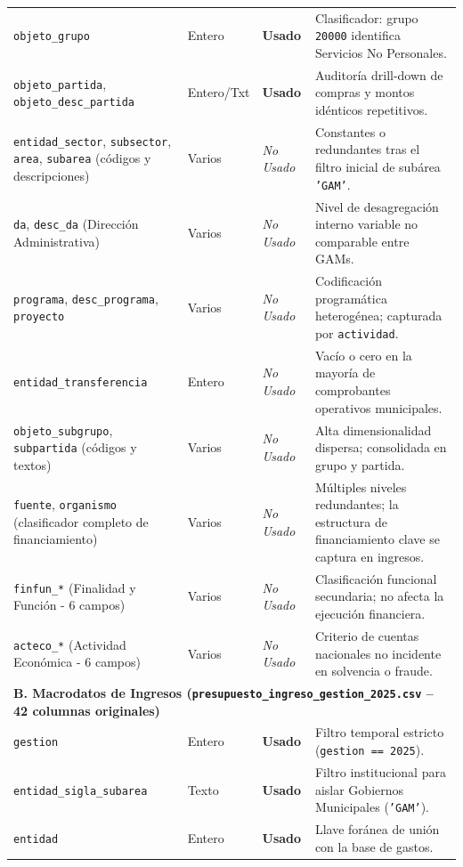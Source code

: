 \begin{table}[H]
\begin{tabularx}{\textwidth}{p{3.2cm}p{1.6cm}p{1.4cm}>{\raggedright\arraybackslash}X}
\texttt{objeto\_grupo} & Entero & \textbf{Usado} & Clasificador: grupo \texttt{20000} identifica Servicios No Personales. \\
\texttt{objeto\_partida}, \texttt{objeto\_desc\_partida} & Entero/Txt & \textbf{Usado} & Auditoría drill-down de compras y montos idénticos repetitivos. \\
\addlinespace
\texttt{entidad\_sector}, \texttt{subsector}, \texttt{area}, \texttt{subarea} (códigos y descripciones) & Varios & \textit{No Usado} & Constantes o redundantes tras el filtro inicial de subárea \texttt{'GAM'}. \\
\texttt{da}, \texttt{desc\_da} (Dirección Administrativa) & Varios & \textit{No Usado} & Nivel de desagregación interno variable no comparable entre GAMs. \\
\texttt{programa}, \texttt{desc\_programa}, \texttt{proyecto} & Varios & \textit{No Usado} & Codificación programática heterogénea; capturada por \texttt{actividad}. \\
\texttt{entidad\_transferencia} & Entero & \textit{No Usado} & Vacío o cero en la mayoría de comprobantes operativos municipales. \\
\texttt{objeto\_subgrupo}, \texttt{subpartida} (códigos y textos) & Varios & \textit{No Usado} & Alta dimensionalidad dispersa; consolidada en grupo y partida. \\
\texttt{fuente}, \texttt{organismo} (clasificador completo de financiamiento) & Varios & \textit{No Usado} & Múltiples niveles redundantes; la estructura de financiamiento clave se captura en ingresos. \\
\texttt{finfun\_*} (Finalidad y Función - 6 campos) & Varios & \textit{No Usado} & Clasificación funcional secundaria; no afecta la ejecución financiera. \\
\texttt{acteco\_*} (Actividad Económica - 6 campos) & Varios & \textit{No Usado} & Criterio de cuentas nacionales no incidente en solvencia o fraude. \\
\midrule
\multicolumn{4}{l}{\textbf{B. Macrodatos de Ingresos (\texttt{presupuesto\_ingreso\_gestion\_2025.csv} -- 42 columnas originales)}} \\
\midrule
\texttt{gestion} & Entero & \textbf{Usado} & Filtro temporal estricto (\texttt{gestion == 2025}). \\
\texttt{entidad\_sigla\_subarea} & Texto & \textbf{Usado} & Filtro institucional para aislar Gobiernos Municipales (\texttt{'GAM'}). \\
\texttt{entidad} & Entero & \textbf{Usado} & Llave foránea de unión con la base de gastos. \\

\end{tabularx}
\end{table}
